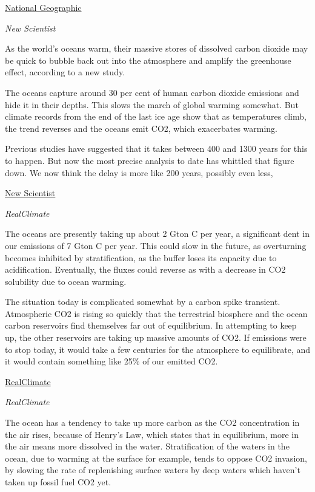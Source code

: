 \documentclass[
]{book}
\begin{document}
\href{https://www.nationalgeographic.com/environment/article/critical-issues-sea-temperature-rise}{National Geographic}

\emph{New Scientist}

As the world's oceans warm, their massive stores of dissolved carbon dioxide may be quick to bubble back out into the atmosphere and amplify the greenhouse effect, according to a new study.

The oceans capture around 30 per cent of human carbon dioxide emissions and hide it in their depths. This slows the march of global warming somewhat. But climate records from the end of the last ice age show that as temperatures climb, the trend reverses and the oceans emit CO2, which exacerbates warming.

Previous studies have suggested that it takes between 400 and 1300 years for this to happen. But now the most precise analysis to date has whittled that figure down.
We now think the delay is more like 200 years, possibly even less,

\href{https://www.newscientist.com/article/dn20413-warmer-oceans-release-co2-faster-than-thought/}{New Scientist}

\emph{RealClimate}

The oceans are presently taking up about 2 Gton C per year, a significant dent in our emissions of 7 Gton C per year. This could slow in the future, as overturning becomes inhibited by stratification, as the buffer loses its capacity due to acidification. Eventually, the fluxes could reverse as with a decrease in CO2 solubility due to ocean warming.

The situation today is complicated somewhat by a carbon spike transient. Atmospheric CO2 is rising so quickly that the terrestrial biosphere and the ocean carbon reservoirs find themselves far out of equilibrium. In attempting to keep up, the other reservoirs are taking up massive amounts of CO2. If emissions were to stop today, it would take a few centuries for the atmosphere to equilibrate, and it would contain something like 25\% of our emitted CO2.

\href{https://www.realclimate.org/index.php/archives/2006/05/positive-feedbacks-from-the-carbon-cycle/}{RealClimate}

\emph{RealClimate}

The ocean has a tendency to take up more carbon as the CO2 concentration in the air rises, because of Henry's Law, which states that in equilibrium, more in the air means more dissolved in the water. Stratification of the waters in the ocean, due to warming at the surface for example, tends to oppose CO2 invasion, by slowing the rate of replenishing surface waters by deep waters which haven't taken up fossil fuel CO2 yet.
\end{document}
